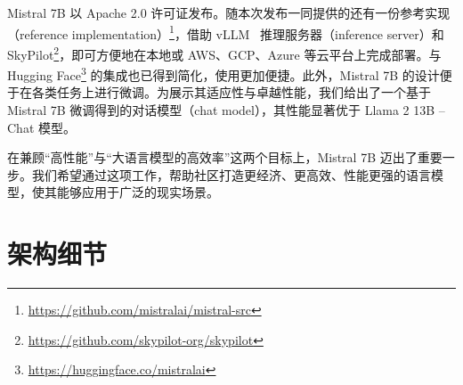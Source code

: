 \documentclass[a4paper,11pt]{article}
\providecommand{\bipar}[2]{#2}
\providecommand{\bisection}[2]{\section{#2}}
\begin{document}
\bipar{Mistral 7B is released under the Apache 2.0 license. This release is accompanied by a reference implementation facilitating easy deployment either locally or on cloud platforms such as AWS, GCP, or Azure using the vLLM \cite{ref17} inference server and SkyPilot. Integration with Hugging Face is also streamlined for easier integration. Moreover, Mistral 7B is crafted for ease of fine-tuning across a myriad of tasks. As a demonstration of its adaptability and superior performance, we present a chat model fine-tuned from Mistral 7B that significantly outperforms the Llama 2 13B – Chat model.}{Mistral 7B 以 Apache 2.0 许可证发布。随本次发布一同提供的还有一份参考实现（reference implementation）\footnote{\url{https://github.com/mistralai/mistral-src}}，借助 vLLM~\cite{ref17} 推理服务器（inference server）和 SkyPilot\footnote{\url{https://github.com/skypilot-org/skypilot}}，即可方便地在本地或 AWS、GCP、Azure 等云平台上完成部署。与 Hugging Face\footnote{\url{https://huggingface.co/mistralai}} 的集成也已得到简化，使用更加便捷。此外，Mistral 7B 的设计便于在各类任务上进行微调。为展示其适应性与卓越性能，我们给出了一个基于 Mistral 7B 微调得到的对话模型（chat model），其性能显著优于 Llama 2 13B – Chat 模型。}

\bipar{Mistral 7B takes a significant step in balancing the goals of getting high performance while keeping large language models efficient. Through our work, our aim is to help the community create more affordable, efficient, and high-performing language models that can be used in a wide range of real-world applications.}{在兼顾“高性能”与“大语言模型的高效率”这两个目标上，Mistral 7B 迈出了重要一步。我们希望通过这项工作，帮助社区打造更经济、更高效、性能更强的语言模型，使其能够应用于广泛的现实场景。}

\bisection{Architectural details}{架构细节}
\label{sec:arch}
\end{document}
